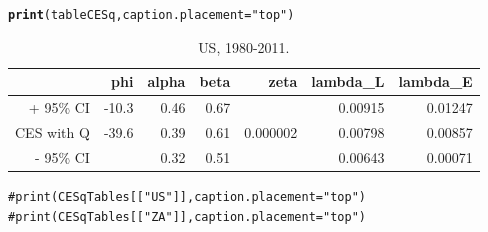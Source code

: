 \documentclass[preprint,authoryear,12pt]{elsarticle}\usepackage{graphicx, color}
\makeatletter
\newcommand{\hlfunctioncall}[1]{\textcolor[rgb]{0.501960784313725,0,0.329411764705882}{\textbf{#1}}}%
\newcommand{\hlstring}[1]{\textcolor[rgb]{0.6,0.6,1}{#1}}%
\newcommand{\hlcomment}[1]{\textcolor[rgb]{0.180392156862745,0.6,0.341176470588235}{#1}}%
\newenvironment{kframe}{%
 \def\at@end@of@kframe{}%
 \ifinner\ifhmode%
  \def\at@end@of@kframe{\end{minipage}}%
  \begin{minipage}{\columnwidth}%
 \fi\fi%
 \def\FrameCommand##1{\hskip\@totalleftmargin \hskip-\fboxsep
 \colorbox{shadecolor}{##1}\hskip-\fboxsep
     \hskip-\linewidth \hskip-\@totalleftmargin \hskip\columnwidth}%
 \MakeFramed {\advance\hsize-\width
   \@totalleftmargin\z@ \linewidth\hsize
   \@setminipage}}%
 {\par\unskip\endMakeFramed%
 \at@end@of@kframe}
\makeatother
\begin{document}
\begin{kframe}
\begin{alltt}
\hlfunctioncall{print}(tableCESq, caption.placement=\hlstring{"top"})
\end{alltt}
\end{kframe}%
\begin{table}[ht]
\begin{center}
\caption{US, 1980-2011.}
\begin{tabular}{rrrrrrr}
  \hline
 & phi & alpha & beta & zeta & lambda\_L & lambda\_E \\ 
  \hline
+ 95\% CI & -10.3 & 0.46 & 0.67 &  & 0.00915 & 0.01247 \\ 
  CES with Q & -39.6 & 0.39 & 0.61 & 0.000002 & 0.00798 & 0.00857 \\ 
  - 95\% CI &  & 0.32 & 0.51 &  & 0.00643 & 0.00071 \\ 
   \hline
\end{tabular}
\end{center}
\end{table}
\begin{kframe}\begin{alltt}

\hlcomment{#print(CESqTables[["US"]], caption.placement="top")}
\hlcomment{#print(CESqTables[["ZA"]], caption.placement="top")}
\end{alltt}
\end{kframe}



\end{document}
